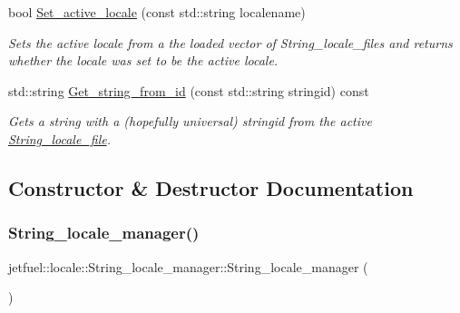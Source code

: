 \begin{DoxyCompactItemize}
bool \hyperlink{classjetfuel_1_1locale_1_1String__locale__manager_a2bca626efc214510e533a8c4ece7cafb}{Set\+\_\+active\+\_\+locale} (const std\+::string localename)
\begin{DoxyCompactList}\small\item\em Sets the active locale from a the loaded vector of String\+\_\+locale\+\_\+files and returns whether the locale was set to be the active locale. \end{DoxyCompactList}\item 
std\+::string \hyperlink{classjetfuel_1_1locale_1_1String__locale__manager_a215fa1aaf302e45b1ab375f764a8d101}{Get\+\_\+string\+\_\+from\+\_\+id} (const std\+::string stringid) const
\begin{DoxyCompactList}\small\item\em Gets a string with a (hopefully universal) stringid from the active \hyperlink{classjetfuel_1_1locale_1_1String__locale__file}{String\+\_\+locale\+\_\+file}. \end{DoxyCompactList}\end{DoxyCompactItemize}


\subsection{Constructor \& Destructor Documentation}
\mbox{\label{classjetfuel_1_1locale_1_1String__locale__manager_a347f49d477102a965dcbf288a79b403a}} 
\subsubsection{\texorpdfstring{String\+\_\+locale\+\_\+manager()}{String\_locale\_manager()}}
{\footnotesize\ttfamily jetfuel\+::locale\+::\+String\+\_\+locale\+\_\+manager\+::\+String\+\_\+locale\+\_\+manager (\begin{DoxyParamCaption}{ }\end{DoxyParamCaption})\hspace{0.3cm}{\ttfamily [inline]}}



